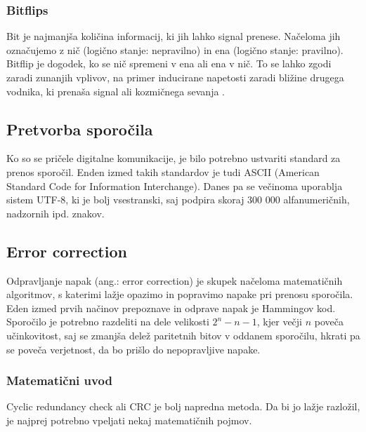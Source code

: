\documentclass[12pt]{article}
\begin{document}
        \subsubsection{Bitflips}
            Bit je najmanjša količina informacij, ki jih lahko signal prenese. 
            Načeloma jih označujemo z nič (logično stanje: nepravilno) in ena 
            (logično stanje: pravilno). Bitflip je dogodek, ko se nič spremeni v
            ena ali ena v nič. To se lahko zgodi zaradi zunanjih vplivov, na 
            primer inducirane napetosti zaradi bližine drugega vodnika, ki 
            prenaša signal ali kozmičnega sevanja \cite{veritasium_computers}.
    \subsection{Pretvorba sporočila} 
        Ko so se pričele digitalne komunikacije, je bilo potrebno ustvariti
        standard za prenos sporočil. Enden izmed takih standardov je tudi ASCII
        (American Standard Code for Information Interchange). Danes pa se
        večinoma uporablja sistem UTF-8, ki je bolj vsestranski, saj podpira
        skoraj 300 000 alfanumeričnih, nadzornih ipd. znakov.
    \subsection{Error correction}
        Odpravljanje napak (ang.: error correction) je skupek načeloma 
        matematičnih algoritmov, s katerimi lažje opazimo in popravimo napake 
        pri prenosu sporočila.
        Eden izmed prvih načinov prepoznave in odprave napak je Hammingov kod. 
        Sporočilo je potrebno razdeliti na dele velikosti $2^n - n - 1$,
        kjer večji $n$ poveča učinkovitost, saj se zmanjša delež paritetnih
        bitov v oddanem sporočilu, hkrati pa se poveča verjetnost, da bo prišlo
        do nepopravljive napake.
        \subsubsection{Matematični uvod}
            Cyclic redundancy check ali CRC je bolj napredna metoda. Da bi jo 
            lažje razložil, je najprej potrebno vpeljati nekaj matematičnih 
            pojmov.
\end{document}
